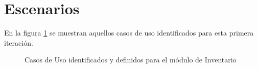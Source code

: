 \section{Escenarios}

En la figura \ref{fig:Escenarios} se muestran aquellos casos de uso identificados para esta primera iteración.

\begin{figure}[hbtp!]
	\begin{center}	
		\label{fig:Escenarios}
		\caption{Casos de Uso identificados y definidos para el módulo de Inventario}
	\end{center}
\end{figure}